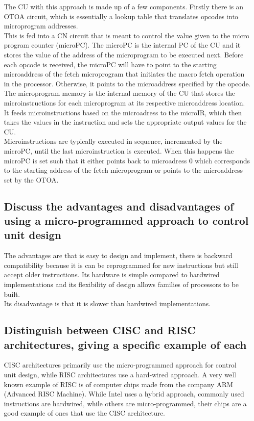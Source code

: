 \documentclass{article}
\begin{document}
The CU with this approach is made up of a few components. Firstly there is an OTOA circuit, which is essentially a lookup table that translates opcodes into microprogram addresses. \\
This is fed into a CN circuit that is meant to control the value given to the micro program counter (microPC). The microPC is the internal PC of the CU and it stores the value of the address of the microprogram to be executed next. Before each opcode is received, the microPC will have to point to the starting microaddress of the fetch microprogram that initiates the macro fetch operation in the processor. Otherwise, it points to the microaddress specified by the opcode. \\
The microprogram memory is the internal memory of the CU that stores the microinstructions for each microprogram at its respective microaddress location. \\
It feeds microinstructions based on the microadress to the microIR, which then takes the values in the instruction and sets the appropriate output values for the CU. 
\\
Microinstructions are typically executed in sequence, incremented by the microPC, until the last microinstruction is executed. When this happens the microPC is set such that it either points back to microadress 0 which corresponds to the starting address of the fetch microprogram or points to the microaddress set by the OTOA.

\subsection{Discuss the advantages and disadvantages of using a micro-programmed approach to control unit design}

The advantages are that is easy to design and implement, there is backward compatibility because it is can be reprogrammed for new instructions but still accept older instructions. Its hardware is simple compared to hardwired implementations and its flexibility of design allows families of processors to be built. \\
Its disadvantage is that it is slower than hardwired implementations.

\subsection{Distinguish between CISC and RISC architectures, giving a specific example of each}

CISC architectures primarily use the micro-programmed approach for control unit design, while RISC architectures use a hard-wired approach. A very well known example of RISC is of computer chips made from the company ARM (Advanced RISC Machine). While Intel uses a hybrid approach, commonly used instructions are hardwired, while others are micro-programmed, their chips are a good example of ones that use the CISC architecture.
\end{document}
